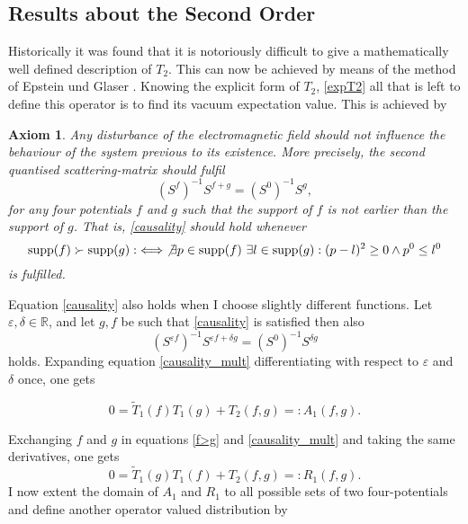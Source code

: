 \documentclass[b5paper,draft,openbib,12pt]{memoir}
\newtheorem{axiom}{Axiom}
\DeclareMathOperator{\supp}{supp}
\begin{document}
\subsection{Results about the Second Order}\label{sec: second order}
Historically it was found that it is notoriously difficult to give a mathematically well defined description of \(T_2\). This can now be achieved by means of the method of Epstein und Glaser \cite{epstein1973role}. Knowing the explicit form of \(T_2\),
 \eqref{expT2} all that is left to define this operator is to find its vacuum expectation value. 
This is achieved by
\begin{axiom}\label{ax:causality} Any disturbance of the electromagnetic field should not influence the behaviour of the system previous to its existence. More precisely, the second quantised scattering-matrix should fulfil
\begin{equation}\label{causality}
\left( S^f \right)^{-1} S^{f+g}= \left( S^0 \right)^{-1} S^{g}\tag{causality},
\end{equation}
 for any four potentials \(f\) and \(g\) such that the support of \(f\) is not earlier than the support of \(g\). That is, \eqref{causality} should hold whenever
 \begin{equation}\label{f>g}
 \supp (f) \succ \supp (g) :\iff  \not\exists p\in\supp (f)  \text{ } \exists l\in \supp (g): (p-l)^2 \ge 0 \wedge p^0 \le l^0
 \end{equation}
is fulfilled.
\end{axiom}


 Equation \eqref{causality} also holds when I choose slightly different functions. Let \(\varepsilon, \delta\in \mathbb{R}\), and let \(g,f\) be such that \eqref{causality} is satisfied  then also
\begin{equation}\label{causality_mult}
\left( S^{\varepsilon f} \right)^{-1} S^{\varepsilon f+ \delta g}= \left( S^0 \right)^{-1} S^{\delta g}
\end{equation}
holds. Expanding equation \eqref{causality_mult} differentiating with respect to \(\varepsilon\) and \(\delta\) once, one gets

\begin{equation}\label{defA_1}
0=\tilde{T}_1 (f) T_1(g) + T_2(f,g)=:A_1(f,g).
\end{equation}

Exchanging \(f\) and \(g\) in equations \eqref{f>g} and \eqref{causality_mult} and taking the same derivatives, one gets 
\begin{equation}\label{defR_1}
0=\tilde{T}_1 (g) T_1(f) + T_2(f,g)=:R_1(f,g).
\end{equation}
I now extent the domain of \(A_1\) and \(R_1\) to all possible sets of two four-potentials and define another operator valued distribution by 
\end{document}
